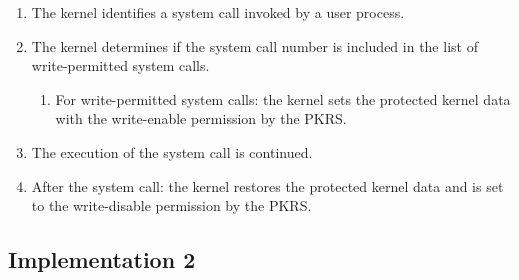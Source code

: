 \begin{enumerate}[topsep=0pt]%
\item The kernel identifies a system call invoked by a user process.
  
  
\item The kernel determines if the system call number is included in the list of write-permitted system calls.

\begin{enumerate}[topsep=0pt]%
\item For write-permitted system calls: the kernel sets the protected kernel data with
the write-enable permission by the PKRS.
\end{enumerate}
  
\item The execution of the system call is continued.
\item After the system call: the kernel restores the protected kernel data and
is set to the write-disable permission by the PKRS.

\end{enumerate}


\subsection{Implementation 2} \label{subsection:imp02_write_handling}

